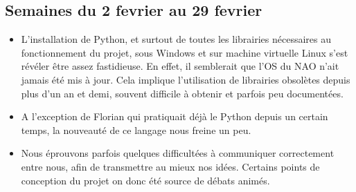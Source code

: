   \subsection{Semaines du 2 fevrier au 29 fevrier}
  \label{sub:Semaines du 2 fevrier au 29 fevrier}
    \begin{itemize}
      \item L'installation de Python, et surtout de toutes les librairies nécessaires au fonctionnement du projet, sous Windows et sur machine virtuelle Linux s'est révéler être assez fastidieuse.
      En effet, il semblerait que l'OS du NAO n'ait jamais été mis à jour. Cela implique l’utilisation de librairies obsolètes depuis plus d’un an et demi, souvent difficile à obtenir et parfois peu documentées.
      \item A l'exception de Florian qui pratiquait déjà le Python depuis un certain temps, la nouveauté de ce langage nous freine un peu.
      \item Nous éprouvons parfois quelques difficultées à communiquer correctement entre nous, afin de transmettre au mieux nos idées.
      Certains points de conception du projet on donc été source de débats animés.\\
    \end{itemize}



